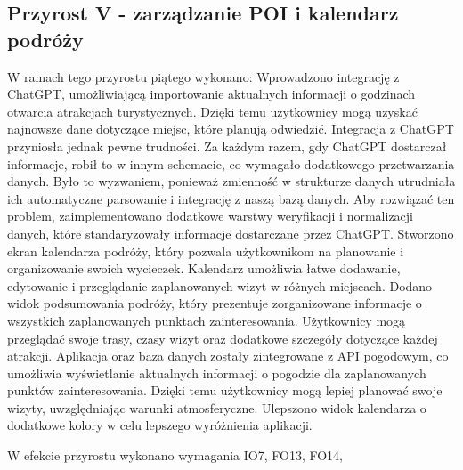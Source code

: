     \subsection{Przyrost V - zarządzanie POI i kalendarz podróży}
    \label{sec:przyrost5}

    W ramach tego przyrostu piątego wykonano:
    Wprowadzono integrację z ChatGPT, umożliwiającą importowanie aktualnych informacji o godzinach otwarcia atrakcjach turystycznych. 
    Dzięki temu użytkownicy mogą uzyskać najnowsze dane dotyczące miejsc, które planują odwiedzić.\newline
    \indent Integracja z ChatGPT przyniosła jednak pewne trudności. Za każdym razem, gdy ChatGPT dostarczał informacje, robił to w innym schemacie, 
    co wymagało dodatkowego przetwarzania danych. Było to wyzwaniem, ponieważ zmienność w strukturze danych utrudniała ich automatyczne parsowanie i integrację z naszą bazą danych. \newline 
    \indent Aby rozwiązać ten problem, zaimplementowano dodatkowe warstwy weryfikacji i normalizacji danych, które standaryzowały informacje dostarczane przez ChatGPT.\newline
    \indent Stworzono ekran kalendarza podróży, który pozwala użytkownikom na planowanie i organizowanie swoich wycieczek.
    Kalendarz umożliwia łatwe dodawanie, edytowanie i przeglądanie zaplanowanych wizyt w różnych miejscach.
    \indent Dodano widok podsumowania podróży, który prezentuje zorganizowane informacje o wszystkich zaplanowanych punktach zainteresowania. 
    Użytkownicy mogą przeglądać swoje trasy, czasy wizyt oraz dodatkowe szczegóły dotyczące każdej atrakcji. \newline
    \indent Aplikacja oraz baza danych zostały zintegrowane z API pogodowym, co umożliwia wyświetlanie aktualnych informacji o pogodzie dla zaplanowanych punktów zainteresowania. 
    Dzięki temu użytkownicy mogą lepiej planować swoje wizyty, uwzględniając warunki atmosferyczne. \newline
    Ulepszono widok kalendarza o dodatkowe kolory w celu lepszego wyróżnienia aplikacji. 

    W efekcie przyrostu wykonano wymagania IO7, FO13, FO14,

